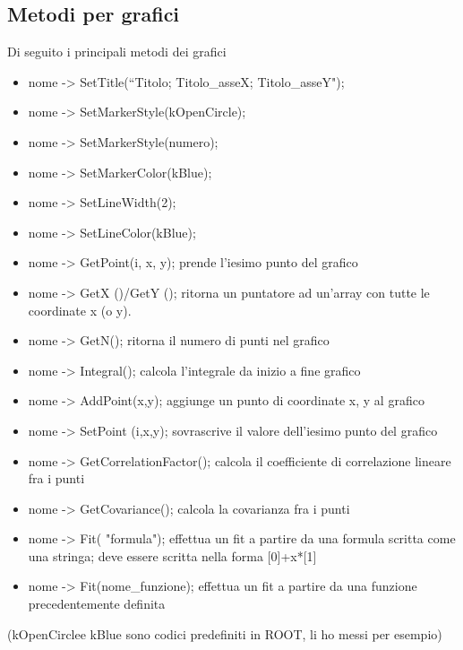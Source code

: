 \documentclass[10pt,a4paper]{article}
\begin{document}
\subsection{Metodi per grafici}
Di seguito i principali metodi dei grafici
\begin{itemize}
	\item nome -> SetTitle(“Titolo; Titolo\_asseX; Titolo\_asseY");
	\item nome -> SetMarkerStyle(kOpenCircle);
	\item nome -> SetMarkerStyle(numero);
	\item nome -> SetMarkerColor(kBlue);
	\item nome -> SetLineWidth(2);
	\item nome -> SetLineColor(kBlue);
	\item nome -> GetPoint(i, x, y);
	prende l’iesimo punto del grafico
	\item nome -> GetX ()/GetY ();
	ritorna un puntatore ad un'array con tutte le coordinate x (o y). 
	\item nome -> GetN();
	ritorna il numero di punti nel grafico
	\item nome -> Integral();
	calcola l'integrale da inizio a fine grafico
	\item nome -> AddPoint(x,y);
	aggiunge un punto di coordinate x, y al grafico
	\item nome -> SetPoint (i,x,y);
	sovrascrive il valore dell'iesimo punto del grafico
	\item nome -> GetCorrelationFactor();
	calcola il coefficiente di correlazione lineare fra i punti
	\item nome -> GetCovariance();
	calcola la covarianza fra i punti
	\item nome -> Fit( "formula");
	effettua un fit a partire da una formula scritta come una stringa; deve essere scritta nella forma [0]+x*[1]
	\item nome -> Fit(nome\_funzione);
	effettua un fit a partire da una funzione precedentemente definita
\end{itemize}
(kOpenCirclee kBlue sono codici predefiniti in ROOT, li ho messi per esempio)
\end{document}
